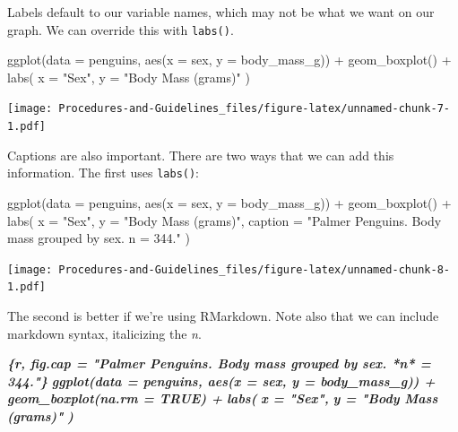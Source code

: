 \documentclass[
]{book}
\newenvironment{Shaded}{\begin{snugshade}}{\end{snugshade}}
\newcommand{\AttributeTok}[1]{\textcolor[rgb]{0.77,0.63,0.00}{#1}}
\newcommand{\FunctionTok}[1]{\textcolor[rgb]{0.00,0.00,0.00}{#1}}
\newcommand{\InformationTok}[1]{\textcolor[rgb]{0.56,0.35,0.01}{\textbf{\textit{#1}}}}
\newcommand{\NormalTok}[1]{#1}
\newcommand{\SpecialCharTok}[1]{\textcolor[rgb]{0.00,0.00,0.00}{#1}}
\newcommand{\StringTok}[1]{\textcolor[rgb]{0.31,0.60,0.02}{#1}}
\begin{document}
Labels default to our variable names, which may not be what we want on our graph. We can override this with \texttt{labs()}.

\begin{Shaded}
\begin{Highlighting}[]
\FunctionTok{ggplot}\NormalTok{(}\AttributeTok{data =}\NormalTok{ penguins, }\FunctionTok{aes}\NormalTok{(}\AttributeTok{x =}\NormalTok{ sex, }\AttributeTok{y =}\NormalTok{ body\_mass\_g)) }\SpecialCharTok{+}
  \FunctionTok{geom\_boxplot}\NormalTok{() }\SpecialCharTok{+}
  \FunctionTok{labs}\NormalTok{(}
    \AttributeTok{x =} \StringTok{"Sex"}\NormalTok{,}
    \AttributeTok{y =} \StringTok{"Body Mass (grams)"}
\NormalTok{  )}
\end{Highlighting}
\end{Shaded}

\texttt{[image: Procedures-and-Guidelines\_files/figure-latex/unnamed-chunk-7-1.pdf]}

Captions are also important. There are two ways that we can add this information. The first uses \texttt{labs()}:

\begin{Shaded}
\begin{Highlighting}[]
\FunctionTok{ggplot}\NormalTok{(}\AttributeTok{data =}\NormalTok{ penguins, }\FunctionTok{aes}\NormalTok{(}\AttributeTok{x =}\NormalTok{ sex, }\AttributeTok{y =}\NormalTok{ body\_mass\_g)) }\SpecialCharTok{+}
  \FunctionTok{geom\_boxplot}\NormalTok{() }\SpecialCharTok{+}
  \FunctionTok{labs}\NormalTok{(}
    \AttributeTok{x =} \StringTok{"Sex"}\NormalTok{,}
    \AttributeTok{y =} \StringTok{"Body Mass (grams)"}\NormalTok{,}
    \AttributeTok{caption =} \StringTok{"Palmer Penguins. Body mass grouped by sex. n = 344."}
\NormalTok{  )}
\end{Highlighting}
\end{Shaded}

\texttt{[image: Procedures-and-Guidelines\_files/figure-latex/unnamed-chunk-8-1.pdf]}

The second is better if we're using RMarkdown. Note also that we can include markdown syntax, italicizing the \emph{n}.

\begin{Shaded}
\begin{Highlighting}[]
\InformationTok{\textasciigrave{}\textasciigrave{}\textasciigrave{}\{r, fig.cap = "Palmer Penguins. Body mass grouped by sex. *n* = 344."\}  }
\InformationTok{ggplot(data = penguins, aes(x = sex, y = body\_mass\_g)) +  }
\InformationTok{  geom\_boxplot(na.rm = TRUE) +  }
\InformationTok{  labs(}
\InformationTok{    x = "Sex",}
\InformationTok{    y = "Body Mass (grams)"}
\InformationTok{  )}
\InformationTok{\textasciigrave{}\textasciigrave{}\textasciigrave{}}
\end{Highlighting}
\end{Shaded}
\end{document}
